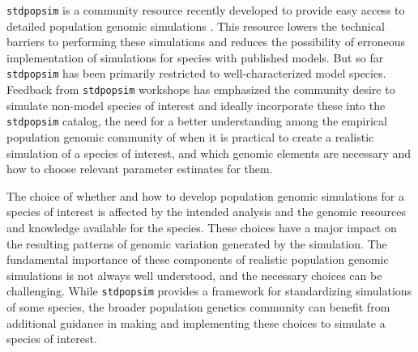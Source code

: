 \documentclass[hidelinks]{article}
\newcommand{\stdpopsim}{\texttt{stdpopsim}\xspace}
\begin{document}
\stdpopsim is a community resource recently developed to provide easy
access to detailed population genomic simulations \citep{Adrion2020}. This
resource lowers the technical barriers to performing these simulations
and reduces the possibility of erroneous implementation of simulations
for species with published models. But so far \stdpopsim has been
primarily restricted to well-characterized model species. Feedback from
\stdpopsim workshops has emphasized the community desire to simulate
non-model species of interest and ideally incorporate these into the \stdpopsim catalog,
the need for a better understanding among the empirical population
genomic community of when it is practical to create a realistic
simulation of a species of interest, and which genomic elements are
necessary and how to choose relevant parameter estimates for them.

The choice of whether and how to develop population genomic
simulations for a species of interest is affected by the intended
analysis and the genomic resources and knowledge available for the
species. These choices have a major impact on the resulting patterns of
genomic variation generated by the simulation. The fundamental
importance of these components of realistic population genomic
simulations is not always well understood, and the necessary choices can
be challenging. While \stdpopsim provides a framework for standardizing
simulations of some species, the broader population genetics community
can benefit from additional guidance in making and implementing these
choices to simulate a species of interest.
\end{document}
